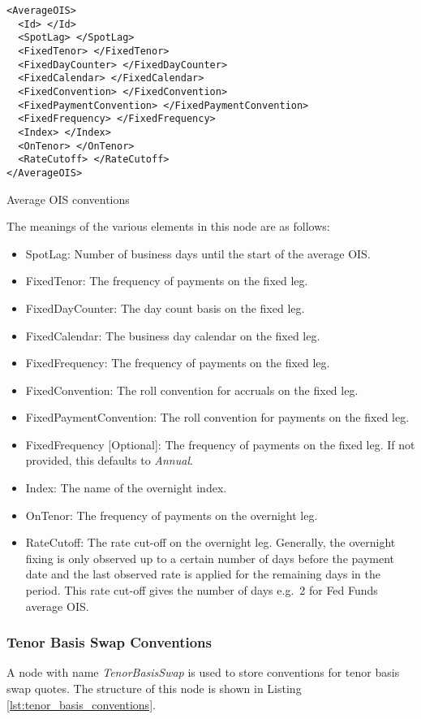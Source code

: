 \begin{listing}[H]
\begin{verbatim}
<AverageOIS>
  <Id> </Id>
  <SpotLag> </SpotLag>
  <FixedTenor> </FixedTenor>
  <FixedDayCounter> </FixedDayCounter>
  <FixedCalendar> </FixedCalendar>
  <FixedConvention> </FixedConvention>
  <FixedPaymentConvention> </FixedPaymentConvention>
  <FixedFrequency> </FixedFrequency>
  <Index> </Index>
  <OnTenor> </OnTenor>
  <RateCutoff> </RateCutoff>
</AverageOIS>
\end{verbatim}
\caption{Average OIS conventions}
\label{lst:average_ois_conventions}
\end{listing}


The meanings of the various elements in this node are as follows:
\begin{itemize}
\item SpotLag: Number of business days until the start of the average OIS.
\item FixedTenor: The frequency of payments on the fixed leg.
\item FixedDayCounter: The day count basis on the fixed leg.
\item FixedCalendar: The business day calendar on the fixed leg.
\item FixedFrequency: The frequency of payments on the fixed leg.
\item FixedConvention: The roll convention for accruals on the fixed leg.
\item FixedPaymentConvention: The roll convention for payments on the fixed leg.
\item FixedFrequency [Optional]: The frequency of payments on the fixed leg. If not provided, this defaults to \emph{Annual}.
\item Index: The name of the overnight index.
\item OnTenor: The frequency of payments on the overnight leg.
\item RateCutoff: The rate cut-off on the overnight leg. Generally, the overnight fixing is only observed up to a
certain number of days before the payment date and the last observed rate is applied for the remaining days in the
period. This rate cut-off gives the number of days e.g.\ 2 for Fed Funds average OIS.
\end{itemize}

\subsubsection{Tenor Basis Swap Conventions}
A node with name \emph{TenorBasisSwap} is used to store conventions for tenor basis swap quotes. The structure of this 
node is shown in Listing \ref{lst:tenor_basis_conventions}.

